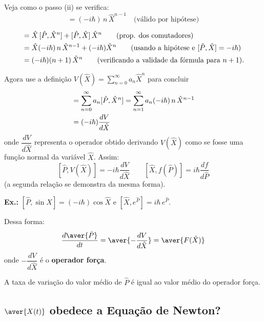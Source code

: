 Veja como o passo (ii) se verifica:
\begin{equation}
    [\hat{P}, \hat{X}^n] = (-i\hbar)\, n\, \hat{X}^{n-1} \quad \text{(válido por hipótese)}
\label{eq:aula15_inducao_hipotese}
\end{equation}

\begin{align}
    [\hat{P}, \hat{X}^{n+1}] &= \hat{X}\,[\hat{P}, \hat{X}^n] + [\hat{P}, \hat{X}]\,\hat{X}^n \qquad \text{(prop. dos comutadores)} \notag \\
    &= \hat{X}(-i\hbar)\, n\, \hat{X}^{n-1} + (-i\hbar)\hat{X}^n \qquad \text{(usando a hipótese e } [\hat{P}, \hat{X}] = -i\hbar\text{)} \notag \\
    &= (-i\hbar)(n+1)\,\hat{X}^n \qquad \text{(verificando a validade da fórmula para } n+1\text{)}.
\label{eq:aula15_inducao_passo}
\end{align}

Agora use a definição $V(\hat{X}) = \displaystyle\sum_{n=0}^{\infty} a_n \hat{X}^n$ para concluir
\begin{align}
    [\hat{P}, V(\hat{X})] &= \sum_{n=0}^{\infty} a_n [\hat{P}, \hat{X}^n] = \sum_{n=1}^{\infty} a_n (-i\hbar)\, n\, \hat{X}^{n-1} \notag \\
    &= (-i\hbar)\frac{dV}{d\hat{X}}
\label{eq:aula15_comutador_P_V}
\end{align}
onde $\dfrac{dV}{d\hat{X}}$ representa o operador obtido derivando $V(\hat{X})$ como se fosse uma função normal da variável $\hat{X}$. Assim:
\begin{equation}
    \boxed{[\hat{P}, V(\hat{X})] = -i\hbar \frac{dV}{d\hat{X}}} \qquad \boxed{[\hat{X}, f(\hat{P})] = i\hbar \frac{df}{d\hat{P}}}
\label{eq:aula15_comutadores_gerais}
\end{equation}
(a segunda relação se demonstra da mesma forma).

\textbf{Ex.:} $[\hat{P}, \sin \hat{X}] = (-i\hbar)\cos\hat{X}$ e $[\hat{X}, e^{\hat{P}}] = i\hbar\, e^{\hat{P}}$.

Dessa forma:
\begin{equation}
    \frac{d\aver{\hat{P}}}{dt} = \aver{-\frac{dV}{d\hat{X}}} = \aver{F(\hat{X})}
\label{eq:aula15_dP_dt_resultado}
\end{equation}
onde $-\dfrac{dV}{d\hat{X}}$ é o \textbf{operador força}.

A taxa de variação do valor médio de $\hat{P}$ é igual ao valor médio do operador força.

\subsection*{$\aver{X(t)}$ obedece a Equação de Newton?}

